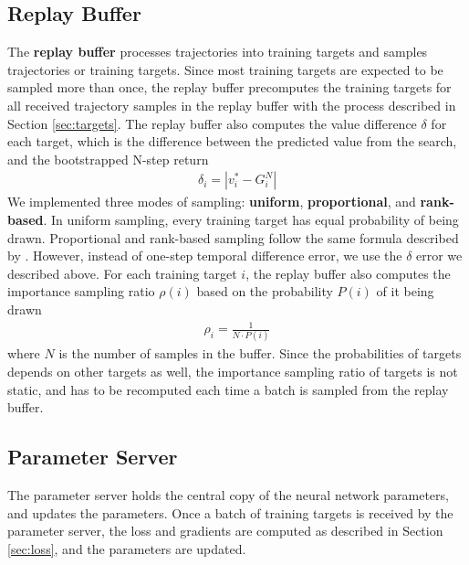 \subsection{Replay Buffer} \label{sec:replay}
The \textbf{replay buffer} processes trajectories into training targets and samples trajectories or training targets.
Since most training targets are expected to be sampled more than once,
the replay buffer precomputes the training targets for all received trajectory samples in the replay buffer with the process described in Section \ref{sec:targets}.
The replay buffer also computes the value difference $\delta$ for each target,
which is the difference between the predicted value from the search, and the bootstrapped N-step return
\begin{align*}
    \delta_i = | v^*_i - G^N_i |
\end{align*}
We implemented three modes of sampling: \textbf{uniform}, \textbf{proportional}, and \textbf{rank-based}.
In uniform sampling, every training target has equal probability of being drawn.
Proportional and rank-based sampling follow the same formula described by \citeauthor{PrioritizedExperienceReplay_Schaul.Quan.ea_2016} \cite{PrioritizedExperienceReplay_Schaul.Quan.ea_2016}.
However, instead of one-step temporal difference error, we use the $\delta$ error we described above.
For each training target $i$, the replay buffer also computes the importance sampling ratio $\rho(i)$ based on the probability $P(i)$ of it being drawn
\begin{align*}
    \rho_{i}= \frac{1}{N \cdot P(i)}
\end{align*}
where $N$ is the number of samples in the buffer.
Since the probabilities of targets depends on other targets as well, the importance sampling ratio of targets is not static,
and has to be recomputed each time a batch is sampled from the replay buffer.

\subsection{Parameter Server} \label{sec:param_server}
The parameter server holds the central copy of the neural network parameters, and updates the parameters.
Once a batch of training targets is received by the parameter server, the loss and gradients are computed as described in Section \ref{sec:loss}, and the parameters are updated.

